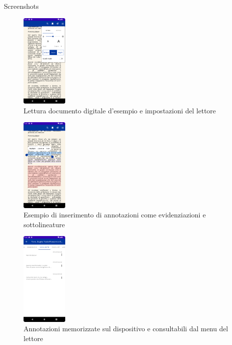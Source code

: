 \documentclass[10pt]{beamer}
\begin{document}
    \begin{frame}{Screenshots}
        \begin{multicols}{3}
            \begin{figure}[H]
                \includegraphics[width=0.2\textwidth]{reader_settings.png}
                \caption{Lettura documento digitale d'esempio e impostazioni del lettore}
                \label{reader}
            \end{figure}
            
            \begin{figure}[H]
                \includegraphics[width=0.2\textwidth]{annotations.png}
                \caption{Esempio di inserimento di annotazioni come evidenziazioni e sottolineature}
                \label{annotations}
            \end{figure}
            
            \begin{figure}[H]
                \includegraphics[width=0.2\textwidth]{annotation2.png}
                \caption{Annotazioni memorizzate sul dispositivo e consultabili dal menu del lettore}
                \label{annotation2}
            \end{figure}
        \end{multicols}
    \end{frame}
\end{document}
